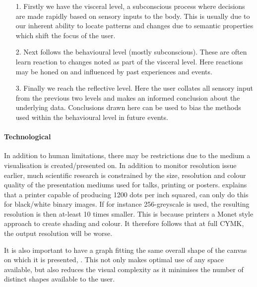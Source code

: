 \begin{itemize}
\item[1.] Firstly we have the visceral level, a subconscious process where decisions are made rapidly based on sensory inputs to the body. 
This is usually due to our inherent ability to locate patterns and changes due to semantic properties which shift the focus of the user.  

\item[2.] Next follows the behavioural level (mostly subconscious). These are often learn reaction to changes noted as part of the visceral level. Here reactions may be honed on and influenced by past experiences and events. 

\item[3.] Finally we reach the reflective level. Here the user collates all sensory input from the previous two levels and makes an informed conclusion about the underlying data. Conclusions drawn here can be used to bias the methods used within the behavioural level in future events. 
\end{itemize}

\paragraph*{Technological}
In addition to human limitations, there may be restrictions due to the medium a visualisation is created/presented on. In addition to monitor resolution issue earlier, much scientific research is constrained by the size, resolution and colour quality of the presentation mediums used for talks, printing or posters. \cite{ware} explains that a printer capable of producing 1200 dots per inch squared, can only do this for black/white binary images. If for instance 256-greyscale is used, the resulting resolution is then at-least 10 times smaller. This is because printers a Monet style approach to create shading and colour. It therefore follows that at full CYMK, the output resolution will be worse. 

It is also important to have a graph fitting the same overall shape of the canvas on which it is presented, \cite{graphmetnew}. This not only makes optimal use of any space available, but also reduces the visual complexity as it minimises the number of distinct shapes available to the user. 




 




